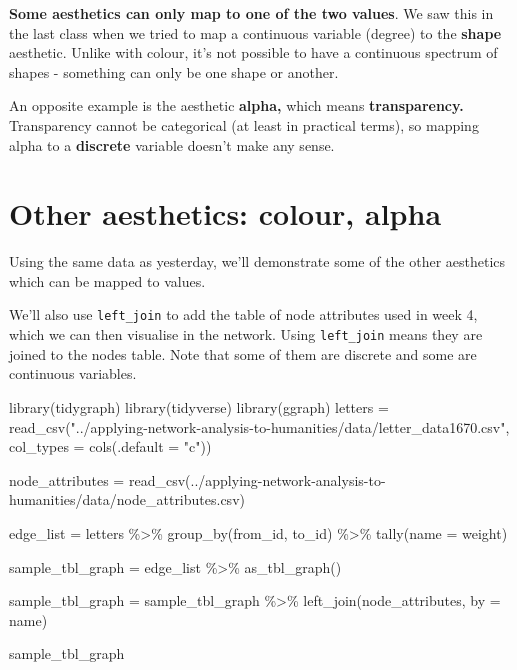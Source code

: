 \documentclass[
]{book}
\newenvironment{Shaded}{\begin{snugshade}}{\end{snugshade}}
\newcommand{\AttributeTok}[1]{\textcolor[rgb]{0.77,0.63,0.00}{#1}}
\newcommand{\FunctionTok}[1]{\textcolor[rgb]{0.00,0.00,0.00}{#1}}
\newcommand{\NormalTok}[1]{#1}
\newcommand{\OtherTok}[1]{\textcolor[rgb]{0.56,0.35,0.01}{#1}}
\newcommand{\SpecialCharTok}[1]{\textcolor[rgb]{0.00,0.00,0.00}{#1}}
\newcommand{\StringTok}[1]{\textcolor[rgb]{0.31,0.60,0.02}{#1}}
\begin{document}
\textbf{Some aesthetics can only map to one of the two values}. We saw this in the last class when we tried to map a continuous variable (degree) to the \textbf{shape} aesthetic. Unlike with colour, it's not possible to have a continuous spectrum of shapes - something can only be one shape or another.

An opposite example is the aesthetic \textbf{alpha,} which means \textbf{transparency.} Transparency cannot be categorical (at least in practical terms), so mapping alpha to a \textbf{discrete} variable doesn't make any sense.

\hypertarget{other-aesthetics-colour-alpha}{%
\section{Other aesthetics: colour, alpha}\label{other-aesthetics-colour-alpha}}

Using the same data as yesterday, we'll demonstrate some of the other aesthetics which can be mapped to values.

We'll also use \texttt{left\_join} to add the table of node attributes used in week 4, which we can then visualise in the network. Using \texttt{left\_join} means they are joined to the nodes table. Note that some of them are discrete and some are continuous variables.

\begin{Shaded}
\begin{Highlighting}[]
\FunctionTok{library}\NormalTok{(tidygraph)}
\FunctionTok{library}\NormalTok{(tidyverse)}
\FunctionTok{library}\NormalTok{(ggraph)}
\NormalTok{letters }\OtherTok{=} \FunctionTok{read\_csv}\NormalTok{(}\StringTok{"../applying{-}network{-}analysis{-}to{-}humanities/data/letter\_data1670.csv"}\NormalTok{, }\AttributeTok{col\_types =} \FunctionTok{cols}\NormalTok{(}\AttributeTok{.default =} \StringTok{"c"}\NormalTok{))}

\NormalTok{node\_attributes }\OtherTok{=} \FunctionTok{read\_csv}\NormalTok{(}\StringTok{\textquotesingle{}../applying{-}network{-}analysis{-}to{-}humanities/data/node\_attributes.csv\textquotesingle{}}\NormalTok{)}


\NormalTok{edge\_list }\OtherTok{=}\NormalTok{ letters }\SpecialCharTok{\%\textgreater{}\%} 
  \FunctionTok{group\_by}\NormalTok{(from\_id, to\_id) }\SpecialCharTok{\%\textgreater{}\%} 
  \FunctionTok{tally}\NormalTok{(}\AttributeTok{name =} \StringTok{\textquotesingle{}weight\textquotesingle{}}\NormalTok{)}

\NormalTok{sample\_tbl\_graph }\OtherTok{=}\NormalTok{ edge\_list }\SpecialCharTok{\%\textgreater{}\%} 
  \FunctionTok{as\_tbl\_graph}\NormalTok{()}

\NormalTok{sample\_tbl\_graph }\OtherTok{=}\NormalTok{ sample\_tbl\_graph }\SpecialCharTok{\%\textgreater{}\%} \FunctionTok{left\_join}\NormalTok{(node\_attributes, }\AttributeTok{by =} \StringTok{\textquotesingle{}name\textquotesingle{}}\NormalTok{)}

\NormalTok{sample\_tbl\_graph}
\end{Highlighting}
\end{Shaded}
\end{document}
